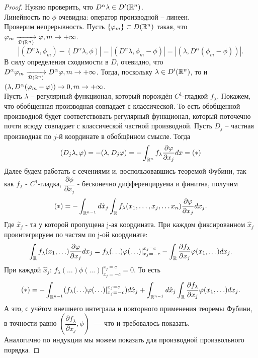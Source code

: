 \begin{proof}
    Нужно проверить, что $D^{\alpha}\lambda \in D'(\mathbb{R}^n)$. \\
    Линейность по $\phi$ очевидна: оператор производной -- линеен. \\
    Проверим непрерывность.
    Пусть $\{\varphi_m\} \subset D(\mathbb{R}^n)$ такая, что $\varphi_m \xrightarrow[\mathcal{D} (\mathbb{R}^n)]{} \varphi, m \rightarrow +\infty$.
    \[
        |(D^{\alpha} \lambda, \phi_m) - (D^{\alpha} \lambda, \phi)| = |(D^{\alpha} \lambda, \phi_m - \phi)| = |(\lambda, D^{\alpha}(\phi_m - \phi))|.
    \]
    В силу определения сходимости в $D$, очевидно, что $D^{\alpha} \varphi_m \xrightarrow[\mathcal{D}(\mathbb{R}^n)]{} D^{\alpha} \varphi, m \rightarrow +\infty$.
    Тогда, поскольку $\lambda \in D'(\mathbb{R}^n)$, то и $(\lambda, D^{\alpha}(\varphi_m - \varphi)) \rightarrow 0, m \rightarrow +\infty$. \\
    Пусть $\lambda$ -- регулярный функционал, который порождён $C^1$-гладкой $f_\lambda$.
    Покажем, что обобщенная производная совпадает с классической. То есть обобщенной производной будет соответствовать регулярный функционал, который поточечно почти всюду совпадает с классической частной производной. Пусть $D_j$ -- частная производная по $j$-й координате в обобщённом смысле. Тогда
    \[
        (D_j \lambda, \varphi) = -(\lambda, D_j \varphi) = -\int_{\mathbb{R}^n} f_{\lambda} \dfrac{\partial \varphi}{\partial x_j}dx = (*)
    \]
    Далее будем работать с сечениями и, воспользовавшись теоремой Фубини, так как $f_{\lambda}$ - $C^1$-гладка, $\dfrac{\partial \phi}{\partial x_j}$ - бесконечно дифференцируема и финитна, получим
    \[
        (*) = -\int_{\mathbb{R}^{n - 1}} d\hat{x}_j \int_{\mathbb{R}} f_{\lambda}(x_1, \ldots, x_j, \ldots x_n) \dfrac{\partial \varphi}{\partial x_j} dx_j.
    \]
    Где $\hat{x}_j$ - та у которой пропущена j-ая координата. При каждом фиксированном $\hat{x}_j$ проинтегрируем по частям по j-ой координате:
    \[
        \int_{\mathbb{R}} f_{\lambda}(x_1, \ldots) \dfrac{\partial \varphi}{\partial x_j} dx_j = f_{\lambda}(\ldots)\varphi(\ldots)|^{x_j=c}_{x_j=-c} - \int_{\mathbb{R}} \dfrac{\partial f_{\lambda}}{\partial x_j} \varphi(x_1, \ldots) dx_j.
    \]
    При каждой $\hat{x}_j$:  $f_{\lambda}(\ldots)\phi(\ldots)|^{x_j=c}_{x_j=-c} = 0$. То есть 
    \[
        (*) = -\int_{\mathbb{R}^{n - 1}} (f_{\lambda}(\ldots)\varphi(\ldots)|^{x_j=c}_{x_j=-c}) d\hat{x}_j + \int_{\mathbb{R}^{n - 1}} d\hat{x}_j \int_{\mathbb{R}} \dfrac{\partial f_{\lambda}}{\partial x_j} \varphi(x_1, \ldots) dx_j .
    \]
    А это, с учётом внешнего интеграла и повторного применения теоремы Фубини, в точности равно $\left(\dfrac{\partial f_{\lambda}}{\partial x_j}, \phi\right)$~---~что и требовалось показать. \\
    Аналогично по индукции мы можем показать для производной произвольного порядка.
\end{proof}
